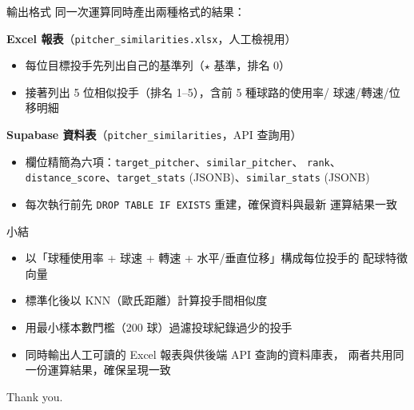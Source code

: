 \documentclass[10pt,aspectratio=169]{beamer}
\newcommand{\runningsection}{}
\newcommand{\setrunningsection}[1]{\renewcommand{\runningsection}{#1}}
\begin{document}
\begin{frame}{輸出格式}
  同一次運算同時產出兩種格式的結果：
  \vspace{0.2cm}

  \textbf{Excel 報表}（\texttt{pitcher\_similarities.xlsx}，人工檢視用）
  \begin{itemize}
    \item 每位目標投手先列出自己的基準列（$\star$ 基準，排名 0）
    \item 接著列出 5 位相似投手（排名 1--5），含前 5 種球路的使用率/
          球速/轉速/位移明細
  \end{itemize}

  \vspace{0.2cm}
  \textbf{Supabase 資料表}（\texttt{pitcher\_similarities}，API 查詢用）
  \begin{itemize}
    \item 欄位精簡為六項：\texttt{target\_pitcher}、\texttt{similar\_pitcher}、
          \texttt{rank}、\texttt{distance\_score}、\texttt{target\_stats}
          (JSONB)、\texttt{similar\_stats} (JSONB)
    \item 每次執行前先 \texttt{DROP TABLE IF EXISTS} 重建，確保資料與最新
          運算結果一致
  \end{itemize}
\end{frame}

\begin{frame}{小結}
  \begin{itemize}
    \item 以「球種使用率 + 球速 + 轉速 + 水平/垂直位移」構成每位投手的
          配球特徵向量
    \item 標準化後以 KNN（歐氏距離）計算投手間相似度
    \item 用最小樣本數門檻（200 球）過濾投球紀錄過少的投手
    \item 同時輸出人工可讀的 Excel 報表與供後端 API 查詢的資料庫表，
          兩者共用同一份運算結果，確保呈現一致
  \end{itemize}
\end{frame}

\setrunningsection{}
\begin{frame}
  \centering
  \vfill
  {\Large Thank you.}
  \vfill
\end{frame}
\end{document}
